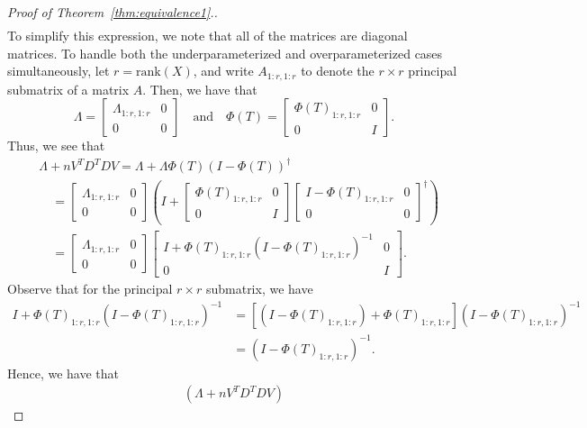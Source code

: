 \documentclass[11pt]{article}
\begin{document}
\begin{proof}[Proof of Theorem~\ref{thm:equivalence1}.]
\begin{align*}
\end{align*}
To simplify this expression, we note that all of the matrices are diagonal matrices. To handle both the underparameterized and overparameterized cases simultaneously, let $r = \mathrm{rank}(X)$, and write $A_{1:r,1:r}$ to denote the $r \times r$ principal submatrix of a matrix $A$. Then, we have that 
\[
    \Lambda = \begin{bmatrix} \Lambda_{1:r,1:r} & 0 \\ 0 & 0 \end{bmatrix}
    \quad\text{and}\quad
    \Phi(T) = \begin{bmatrix}
        \Phi(T)_{1:r, 1:r} & 0 \\ 0 & I
    \end{bmatrix}.
\]
Thus, we see that 
\begin{align*}
    &\Lambda + n V^T D^T D V  = \Lambda + \Lambda \Phi(T)(I-\Phi(T))^{\dagger}  \\
    &\quad= \begin{bmatrix} \Lambda_{1:r,1:r} & 0 \\ 0 & 0 \end{bmatrix} \left(I + \begin{bmatrix}
        \Phi(T)_{1:r, 1:r} & 0 \\ 0 & I
    \end{bmatrix} \begin{bmatrix}
        I - \Phi(T)_{1:r, 1:r} & 0 \\ 0 & 0
    \end{bmatrix}^\dagger\right) \\
    &\quad= \begin{bmatrix} \Lambda_{1:r,1:r} & 0 \\ 0 & 0 \end{bmatrix} \begin{bmatrix}
        I + \Phi(T)_{1:r, 1:r} (I - \Phi(T)_{1:r, 1:r})^{-1} & 0 \\ 0 &  I
    \end{bmatrix}.
\end{align*}
Observe that for the principal $r \times r$ submatrix, we have
\begin{align*}
    I + \Phi(T)_{1:r, 1:r} (I - \Phi(T)_{1:r, 1:r})^{-1}
    &= \left[(I - \Phi(T)_{1:r, 1:r}) + \Phi(T)_{1:r, 1:r} \right](I - \Phi(T)_{1:r, 1:r})^{-1} \\
    &= (I - \Phi(T)_{1:r, 1:r})^{-1}.
\end{align*}
Hence, we have that
\begin{align*}
    \left(\Lambda + n V^T D^T D V \right)

\end{align*}
\end{proof}
\end{document}
